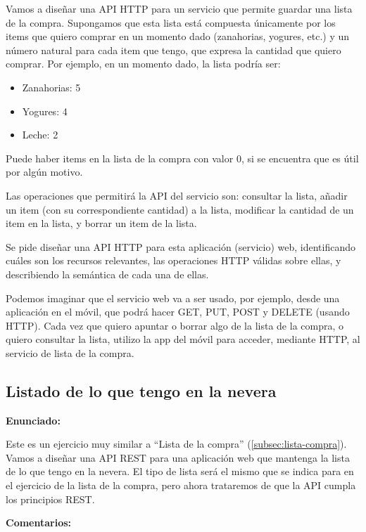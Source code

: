 Vamos a diseñar una API HTTP para un servicio que permite guardar una lista de la compra. Supongamos que esta lista está compuesta únicamente por los items que quiero comprar en un momento dado (zanahorias, yogures, etc.) y un número natural para cada item que tengo, que expresa la cantidad que quiero comprar. Por ejemplo, en un momento dado, la lista podría ser:

\begin{itemize}
\item Zanahorias: 5
\item Yogures: 4
\item Leche: 2
\end{itemize}

Puede haber items en la lista de la compra con valor 0, si se encuentra que es útil por algún motivo.

Las operaciones que permitirá la API del servicio son: consultar la lista, añadir un item (con su correspondiente cantidad) a la lista, modificar la cantidad de un item en la lista, y borrar un item de la lista.

Se pide diseñar una API HTTP para esta aplicación (servicio) web, identificando cuáles son los recursos relevantes, las operaciones HTTP válidas sobre ellas, y describiendo la semántica de cada una de ellas.

Podemos imaginar que el servicio web va a ser usado, por ejemplo, desde una aplicación en el móvil, que podrá hacer GET, PUT, POST y DELETE (usando HTTP). Cada vez que quiero apuntar o borrar algo de la lista de la compra, o quiero consultar la lista, utilizo la app del móvil para acceder, mediante HTTP, al servicio de lista de la compra.

\subsection{Listado de lo que tengo en la nevera}
\label{subsec:contenido-nevera}

\textbf{Enunciado:}

Este es un ejercicio muy similar a ``Lista de la compra'' (\ref{subsec:lista-compra}). Vamos a diseñar una API REST para una aplicación web que mantenga la lista de lo que tengo en la nevera. El tipo de lista será el mismo que se indica para en el ejercicio de la lista de la compra, pero ahora trataremos de que la API cumpla los principios REST.

\textbf{Comentarios:}

